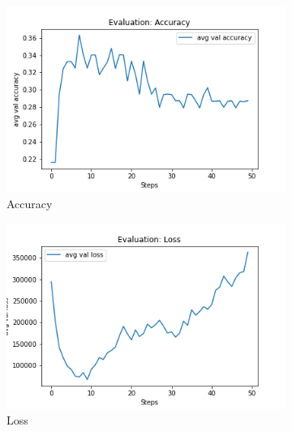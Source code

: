 \begin{figure}[H]
     \centering
     \begin{subfigure}[b]{0.3\textwidth}
         \centering
         \includegraphics[width=\textwidth]{./figure/results/fully_blinded/eval/avg val accuracy.png}
         \caption{Accuracy}
         \label{fig:fb_e_accuracy}
     \end{subfigure}
     \hfill
     \begin{subfigure}[b]{0.3\textwidth}
         \centering
         \includegraphics[width=\textwidth]{./figure/results/fully_blinded/eval/avg val loss.png}
         \caption{Loss}
         \label{fig:fb_e_loss}
     \end{subfigure}
     \hfill
     \begin{subfigure}[b]{0.3\textwidth}
         \centering

\end{subfigure}
\end{figure}
